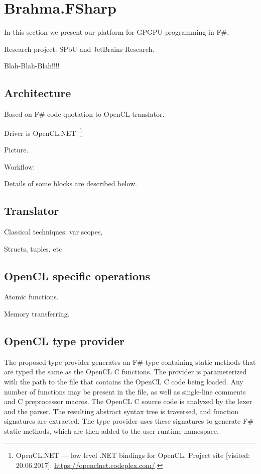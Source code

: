 \section{Brahma.FSharp}

In this section we present our platform for GPGPU programming in F\#.

Research project: SPbU and JetBrains Research.

Blah-Blah-Blah!!!!

\subsection{Architecture}

Based on F\# code quotation to OpenCL translator.

Driver is OpenCL.NET~\footnote{OpenCL.NET --- low level .NET bindings for OpenCL. Project site [visited: 20.06.2017]: \url{https://openclnet.codeplex.com/}.}

Picture.

Workflow:

Details of some blocks are described below.

\subsection{Translator}

Classical techniques: var scopes,

Structs, tuples, etc

\subsection{OpenCL specific operations}

Atomic functions.

Memory transferring.

\subsection{OpenCL type provider}

The proposed type provider generates an F# type containing static methods that are typed the same as the OpenCL C functions. The provider is parameterized with the path to the file that contains the OpenCL C code being loaded. Any number of functions may be present in the file, as well as single-line comments and C preprocessor macros. The OpenCL C source code is analyzed by the lexer and the parser. The resulting abstract syntax tree is traversed, and function signatures are extracted. The type provider uses these signatures to generate F# static methods, which are then added to the user runtime namespace.

